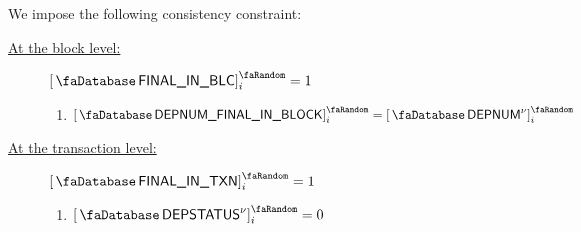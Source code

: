 We impose the following consistency constraint:
\begin{description}
	\item[\underline{At the block level:}]
		\If $\accFinalInBlock _{i} = 1$ \Then
		\begin{enumerate}
			\item $\order{\accDeploymentNumberFinalInBlock} _{i} = \order{\accDeploymentNumber\new} _{i}$
		\end{enumerate}
		\item[\underline{At the transaction level:}]
			\If $\accFinalInTransaction _{i} = 1$ \Then
		\begin{enumerate}
			\item $\order{\accDeploymentStatus\new} _{i} = 0$
		\end{enumerate}
\end{description}
